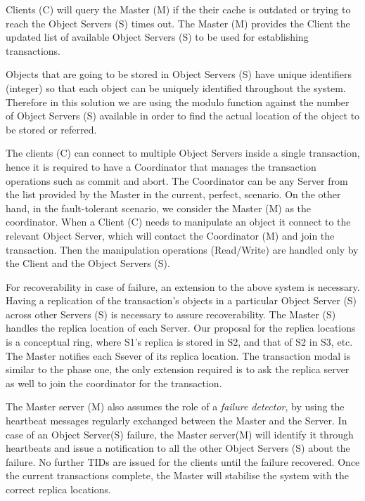 \documentclass[times, 10pt,twocolumn]{article}
\begin{document}
Clients (C) will query the Master (M) if the their cache is outdated or trying to reach the Object Servers (S) times out. The Master (M) provides the Client the updated list of available Object Servers (S) to be used for establishing transactions.

Objects that are going to be stored in Object Servers (S) have unique identifiers (integer) so that each object can be uniquely identified throughout the system. Therefore in this solution we are using the modulo function against the number of Object Servers (S) available in order to find the actual location of the object to be stored or referred.

The clients (C) can connect to multiple Object Servers inside a single transaction, hence it is required to have a Coordinator that manages the transaction operations such as commit and abort.
The Coordinator can be any Server from the list provided by the Master in the current, perfect, scenario. On the other hand, in the fault-tolerant scenario, we consider the Master (M) as the coordinator. When a Client (C) needs to manipulate an object it connect to the relevant Object Server, which will contact the Coordinator (M) and join the transaction. Then the manipulation operations (Read/Write) are handled only by the Client and the Object Servers (S).

\label{subsec:ftsys}
For recoverability in case of failure, an extension to the above system is necessary. Having a replication of the transaction's objects in a particular Object Server (S) across other Servers (S) is necessary to assure recoverability. The Master (S) handles the replica location of each Server. Our proposal for the replica locations is a conceptual ring, where S1's replica is stored in S2, and that of S2 in S3, etc. The Master notifies each Ssever of its replica location. The transaction modal is similar to the phase one, the only extension required is to ask the replica server as well to join the coordinator for the transaction.

The Master server (M) also assumes the role of a {\it failure detector}, by using the heartbeat messages regularly exchanged between the Master and the Server. In case of an Object Server(S) failure, the Master server(M) will identify it through heartbeats and issue a notification to all the other Object Servers (S) about the failure. No further TIDs are issued for the clients until the failure recovered. Once the current transactions complete, the Master will stabilise the system with the correct replica locations.
\end{document}
